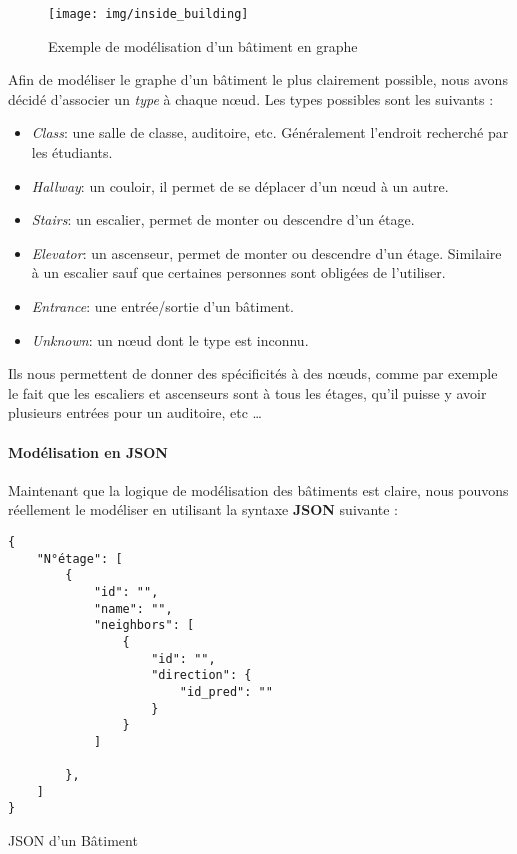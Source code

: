 \documentclass[journal, a4paper]{IEEEtran}
\begin{document}
\begin{figure}[!hbt]
        \center
	\texttt{[image: img/inside\_building]}
	\caption{Exemple de modélisation d'un bâtiment en graphe}\label{fig:inside_building}
\end{figure}

Afin de modéliser le graphe d'un bâtiment le plus clairement possible, nous avons décidé d'associer 
un \textit{type} à chaque nœud. Les types possibles sont les suivants : 
\begin{itemize}
	\item \textit{Class}: une salle de classe, auditoire, etc. Généralement l'endroit recherché par les étudiants.
	\item \textit{Hallway}: un couloir, il permet de se déplacer d'un nœud à un autre.
	\item \textit{Stairs}: un escalier, permet de monter ou descendre d'un étage.
	\item \textit{Elevator}: un ascenseur, permet de monter ou descendre d'un étage. Similaire à un escalier 
		sauf que certaines personnes sont obligées de l'utiliser.
	\item \textit{Entrance}: une entrée/sortie d'un bâtiment.
	\item \textit{Unknown}: un nœud dont le type est inconnu.
\end{itemize}

Ils nous permettent de donner des spécificités à des nœuds, comme par exemple le fait que les escaliers et ascenseurs sont à tous les étages, qu'il puisse y avoir plusieurs entrées pour un auditoire, etc \dots
\vspace{0.25cm}

\paragraph{Modélisation en \textbf{JSON}}

Maintenant que la logique de modélisation des bâtiments est claire, nous pouvons réellement le modéliser en 
utilisant la syntaxe \textbf{JSON} suivante : 

\begin{listing}
    \begin{verbatim}
{
    "N°étage": [
    	{
    		"id": "",
    		"name": "",
    		"neighbors": [
    			{
    				"id": "",
    				"direction": {
    					"id_pred": ""
    				}
    			}
    		]

    	},
    ]
}
    \end{verbatim}
    \caption{JSON d'un Bâtiment} 
    \label{lst:json-building}
\end{listing}
\end{document}
